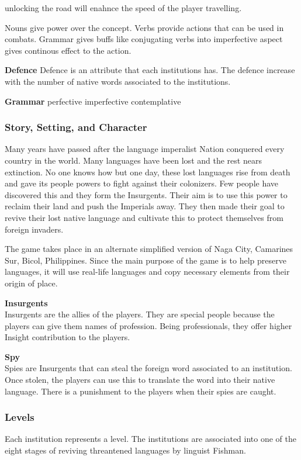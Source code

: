 \documentclass[11pt]{article}
\begin{document}
unlocking the road will enahnce the speed of the player travelling.

Nouns give power over the concept. Verbs provide actions that can be used in combats. Grammar gives buffs like conjugating verbs into imperfective aspect gives continous effect to the action.

\textbf{Defence}
Defence is an attribute that each institutions has. The defence increase with the number of native words associated to the institutions.

\textbf{Grammar}
perfective
imperfective
contemplative




\subsubsection{Story, Setting, and Character}
Many years have passed after the language imperalist Nation conquered every country in the world. Many languages have been lost and the rest nears extinction. No one knows how but one day, these lost languages rise from death and gave its people powers to fight against their colonizers. Few people have discovered this and they form the Insurgents. Their aim is to use this power to reclaim their land and push the Imperials away. They then made their goal to revive their lost native language and cultivate this to protect themselves from foreign invaders. 

The game takes place in an alternate simplified version of Naga City, Camarines Sur, Bicol, Philippines. Since the main purpose of the game is to help preserve languages, it will use real-life languages and copy necessary elements from their origin of place.

\textbf{Insurgents} \\
Insurgents are the allies of the players. They are special people because the players can give them names of profession. Being professionals, they offer higher Insight contribution to the players.

\textbf{Spy}\\
Spies are Insurgents that can steal the foreign word associated to an institution. Once stolen, the players can use this to translate the word into their native language. There is a punishment to the players when their spies are caught.

\subsubsection{Levels}
Each institution represents a level. The institutions are associated into one of the eight stages of reviving threantened languages by linguist Fishman.
\end{document}
